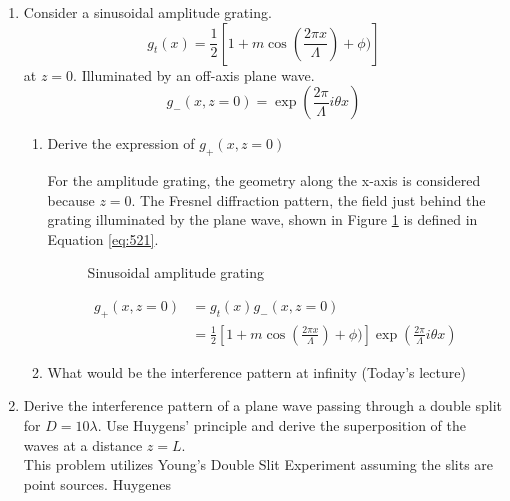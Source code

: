 \documentclass[main.tex]{subfiles}
\begin{document}
\begin{enumerate}
\begin{enumerate}
\end{enumerate}
\item{Consider a sinusoidal amplitude grating.}
$$g_t(x)=\frac{1}{2}\left[ 1+m\cos(\frac{2\pi x}{\Lambda}) + \phi) \right]$$
at $z=0$. Illuminated by an off-axis plane wave.
$$g_{-}(x,z=0)=\exp(\frac{2\pi}{\Lambda}i \theta x)$$
\begin{enumerate}
\item{Derive the expression of $g_{\text{+}}(x,z=0)$}

For the amplitude grating, the geometry along the x-axis is considered because $z=0$. The Fresnel diffraction pattern, the field just behind the grating illuminated by the plane wave, shown in Figure \ref{fig:521} is defined in  Equation \ref{eq:521}.

\begin{figure}
\centering{}
\caption{Sinusoidal amplitude grating}
\label{fig:521}
\end{figure}

\begin{equation}\label{eq:521}
\begin{split}
g_{+}(x, z=0) & = g_{t}(x) g_{-}(x, z=0) \\
 & = \frac{1}{2}\left[ 1+m\cos(\frac{2\pi x}{\Lambda}) + \phi) \right] \exp(\frac{2\pi}{\Lambda}i \theta x)
\end{split}

\end{equation}

\item{What would be the interference pattern at infinity (Today's lecture)}
\end{enumerate}
\item{Derive the interference pattern of a plane wave passing through a double split for $D=10\lambda$. Use Huygens' principle and derive the superposition of the waves at a distance $z=L$.}\\
This problem utilizes Young's Double Slit Experiment assuming the slits are point sources. Huygenes 


\end{enumerate}
\end{document}
